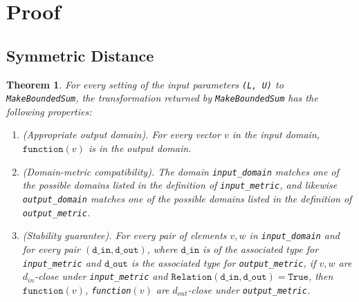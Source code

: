 \documentclass[11pt,a4paper]{article}
\newtheorem{theorem}{Theorem}
\theoremstyle{definition}
\newcommand{\din}{\texttt{d\_in}}
\newcommand{\dout}{\texttt{d\_out}}
\newcommand{\True}{\texttt{True}}
\newcommand{\function}{\texttt{function}}
\begin{document}
\section{Proof}
\subsection{Symmetric Distance}
\begin{theorem}
    For every setting of the input parameters \texttt{(L, U)} to \texttt{MakeBoundedSum}, the transformation returned by \texttt{MakeBoundedSum} has the following properties:
    \begin{enumerate}
        \item \textup{(Appropriate output domain).} For every vector $v$ in the input domain, $\function(v)$ is in the output domain.
        
        \item \textup{(Domain-metric compatibility).} The domain \texttt{input\_domain} matches one of the possible domains listed in the definition of \texttt{input\_metric}, and likewise \texttt{output\_domain} matches one of the possible domains listed in the definition of \texttt{output\_metric}.
        
        \item \textup{(Stability guarantee).} For every pair of elements $v, w$ in \texttt{input\_domain} and for every pair $(\din, \dout)$,  where $\din$ is of the associated type for \texttt{input\_metric} and $\dout$ is the associated type for \texttt{output\_metric}, if $v,w$ are $d_{in}$-close under \texttt{input\_metric} and $\texttt{Relation}(\din, \dout) = \True$, then $\function(v)$, \texttt{function}$(v)$ are $d_{out}$-close under \texttt{output\_metric}.
    \end{enumerate}
\end{theorem}
\end{document}
